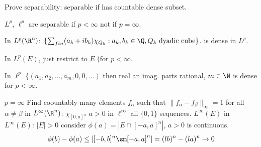 

Prove separability: separable if has countable dense subset. 

\begin{thm}
$L^p$, $\ell^p$ are separable if $p<\infty$ not if $p=\infty$.

In $L^p(\R^n)$: $\{ \sum_{fin} (a_k+ib_k) \chi_{Q_k}: a_k,b_k \in \Q, Q_k \text{ dyadic cube}\}$. is dense in $L^p$.

In $L^p(E)$, just restrict to $E$ (for $p<\infty$.

In $\ell^p$ $\{(a_1,a_2,\ldots,a_m,0,0,\ldots)$ then real an imag. parts rational, $m \in \N$ is dense for $p<\infty$. 


$p=\infty$ Find coountably many elements $f_\alpha$ such that $\|f_\alpha-f_\beta\|_\infty=1$ for all $\alpha \neq \beta$ in $L^\infty(\R^n)$: $\chi_{[0,a]^n}$ $a>0$ in $\ell^\infty$ all $\{0,1\}$ sequences. $L^\infty(E)$ in $L^\infty(E)$: $|E|>0$ consider $\phi(a)= |E \cap [-a,a]^n|$, $a>0$ is continuous. 
	\[
	\phi(b)-\phi(a) \leq |[-b,b]^n \sm [-a,a]^n| = (lb)^n - (la)^n \to 0
	\] 
\end{thm}























